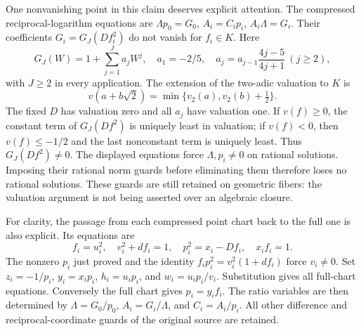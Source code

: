 One nonvanishing point in this claim deserves explicit attention.
The compressed reciprocal-logarithm equations are
$\Lambda p_0=G_0$, $A_i=C_ip_i$, $A_i\Lambda=G_i$.
Their coefficients $G_i=G_J(Df_i^2)$ do not vanish for $f_i\in K$.
Here
\[
 G_J(W)=1+\sum_{j=1}^J a_jW^j,\quad
 a_1=-2/5,\quad a_j=a_{j-1}\frac{4j-5}{4j+1}\ (j\geq2),
\]
with $J\geq2$ in every application.  The extension of the two-adic
valuation to $K$ is
\[
 v(a+b\sqrt2)=\min\{v_2(a),v_2(b)+\tfrac12\}.
\]
The fixed $D$ has valuation zero and all $a_j$ have valuation one.
If $v(f)\geq0$, the constant term of $G_J(Df^2)$ is uniquely least
in valuation; if $v(f)<0$, then $v(f)\leq-1/2$ and the last
nonconstant term is uniquely least.  Thus $G_J(Df^2)\ne0$.
The displayed equations force $\Lambda,p_i\ne0$ on rational solutions.
Imposing their rational norm guards before eliminating them therefore
loses no rational solutions.  These guards are still retained on
geometric fibers: the valuation argument is not being asserted over
an algebraic closure.

For clarity, the passage from each compressed point chart back to the
full one is also explicit.  Its equations are
\[
 f_i=u_i^2,\quad v_i^2+df_i=1,\quad
 p_i^2=x_i-Df_i,\quad x_if_i=1.
\]
The nonzero $p_i$ just proved and the identity
$f_ip_i^2=v_i^2(1+df_i)$ force $v_i\ne0$.
Set $z_i=-1/p_i$, $y_i=x_ip_i$, $h_i=u_ip_i$, and
$w_i=u_ip_i/v_i$.  Substitution gives all full-chart equations.
Conversely the full chart gives $p_i=y_if_i$.
The ratio variables are then determined by
$\Lambda=G_0/p_0$, $A_i=G_i/\Lambda$, and $C_i=A_i/p_i$.
All other difference and reciprocal-coordinate guards of the original
source are retained.

